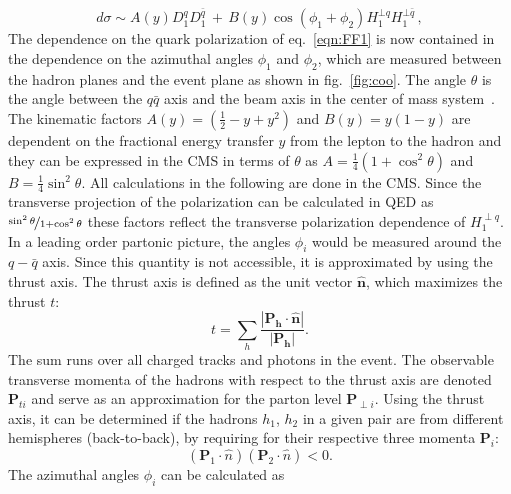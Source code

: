 \documentclass[aps,prX,preprint,groupedaddress,linenumbers]{revtex4-1}
\newcommand{\CFF}{$H_1^{\perp q}$}
\begin{document}
\begin{equation}
d\sigma \sim A(y) D_1^q {D}_1^{\bar{q}} \, + \, B(y) \cos(\phi_1+\phi_2)H^{\bot q}_{1}{H}^{\bot \bar{q} }_{1} \, ,
\label{eqn:FF2}
\end{equation}
The dependence on the quark polarization of eq.~\eqref{eqn:FF1} is now contained in the dependence on the azimuthal angles $\phi_1$ and $\phi_2$, which are measured between the hadron planes and the event plane as shown in fig.~\ref{fig:coo}. 
The angle $\theta$ is the angle  between the $q\bar{q}$ axis and the beam axis in the center of mass system~\cite{Boer:2008fr}.  The kinematic factors $A(y)=(\frac{1}{2}-y+y^2)$ and $B(y)=y(1-y)$ are dependent on the fractional energy transfer $y$ from the lepton to the hadron and they can be expressed in the CMS in terms of \(\theta\) as $A=\frac{1}{4}(1+\cos^2\theta)$ and $B=\frac{1}{4}\sin^2\theta$. All calculations in the following are done in the CMS.
Since the transverse projection of the polarization can be calculated in QED as $\nicefrac{\sin^2\theta}{1+\cos^2 \theta}$ these factors reflect the transverse polarization dependence of \CFF.
In a leading order partonic picture, the angles $\phi_i$ would be measured around the $q-\bar{q}$ axis. Since this quantity is not accessible, it is approximated by using the thrust axis. The thrust axis is defined as the unit vector $\hat{\boldsymbol{n}}$, which maximizes the thrust $t$:
\begin{equation}
\label{eq:thrust}
t=\sum_h\frac{|\boldsymbol{P_h\cdot\hat{n}}|}{|\boldsymbol{P_h}|}.
\end{equation}
The sum runs over all charged tracks and photons in the event. The observable transverse momenta of the hadrons with respect to the thrust axis are denoted $\boldsymbol{P}_{ti}$ and serve as an approximation for the parton level $\boldsymbol{P}_{\perp i}$.
Using the thrust axis, it can be determined if the hadrons $h_1$, $h_2$ in a given pair are from different hemispheres (back-to-back), by requiring for their respective three momenta $\boldsymbol{P}_{i}$:
\begin{equation}
(\boldsymbol{P}_{1} \cdot \hat{n})(\boldsymbol{P}_{2}\cdot \hat{n}) < 0 .
\end{equation}
The azimuthal angles $\phi_i$ can be calculated as 
\end{document}
